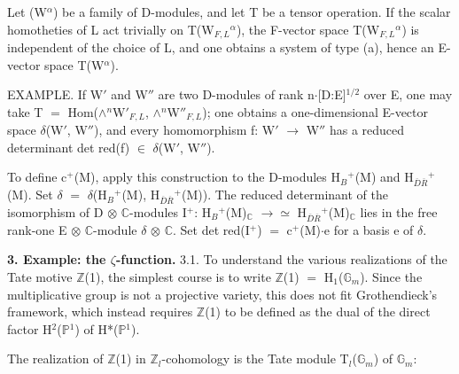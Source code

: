 \documentclass[10pt,twoside]{article}
\newcommand{\SectionLead}[1]{\textbf{\color{D030Accent}#1}}
\begin{document}
Let (W\ensuremath{^{α}}) be a family of D-modules, and let T be a tensor operation. If the scalar homotheties of L act trivially on T(W\ensuremath{_{F,L}}\ensuremath{^{α}}), the F-vector space T(W\ensuremath{_{F,L}}\ensuremath{^{α}}) is independent of the choice of L, and one obtains a system of type (a), hence an E-vector space T(W\ensuremath{^{α}}).\par
EXAMPLE. If W\ensuremath{′} and W\ensuremath{″} are two D-modules of rank n\ensuremath{·}[D:E]\ensuremath{^{1/2}} over E, one may take T \ensuremath{=} Hom(\ensuremath{∧}\ensuremath{^{n}}W\ensuremath{′}\ensuremath{_{F,L}}, \ensuremath{∧}\ensuremath{^{n}}W\ensuremath{″}\ensuremath{_{F,L}}); one obtains a one-dimensional E-vector space \ensuremath{δ}(W\ensuremath{′}, W\ensuremath{″}), and every homomorphism f: W\ensuremath{′} \ensuremath{→} W\ensuremath{″} has a reduced determinant det red(f) \ensuremath{∈} \ensuremath{δ}(W\ensuremath{′}, W\ensuremath{″}).\par
To define c\ensuremath{^{+}}(M), apply this construction to the D-modules H\ensuremath{_{B}}\ensuremath{^{+}}(M) and H\ensuremath{_{\overline{D}\overline{R}}}\ensuremath{^{+}}(M). Set \ensuremath{δ} \ensuremath{=} \ensuremath{δ}(H\ensuremath{_{B}}\ensuremath{^{+}}(M), H\ensuremath{_{\overline{D}\overline{R}}}\ensuremath{^{+}}(M)). The reduced determinant of the isomorphism of D \ensuremath{⊗} \ensuremath{ℂ}-modules I\ensuremath{^{+}}: H\ensuremath{_{B}}\ensuremath{^{+}}(M)\ensuremath{_{ℂ}} \ensuremath{→}\ensuremath{≃} H\ensuremath{_{\overline{D}\overline{R}}}\ensuremath{^{+}}(M)\ensuremath{_{ℂ}} lies in the free rank-one E \ensuremath{⊗} \ensuremath{ℂ}-module \ensuremath{δ} \ensuremath{⊗} \ensuremath{ℂ}. Set det red(I\ensuremath{^{+}}) \ensuremath{=} c\ensuremath{^{+}}(M)\ensuremath{·}e for a basis e of \ensuremath{δ}.\par
\SectionLead{3. Example: the \ensuremath{ζ}-function.} 3.1. To understand the various realizations of the Tate motive \ensuremath{ℤ}(1), the simplest course is to write \ensuremath{ℤ}(1) \ensuremath{=} H\ensuremath{_{1}}(\ensuremath{𝔾}\ensuremath{_{m}}). Since the multiplicative group is not a projective variety, this does not fit Grothendieck’s framework, which instead requires \ensuremath{ℤ}(1) to be defined as the dual of the direct factor H\ensuremath{^{2}}(\ensuremath{ℙ}\ensuremath{^{1}}) of H*(\ensuremath{ℙ}\ensuremath{^{1}}).\par
The realization of \ensuremath{ℤ}(1) in \ensuremath{ℤ}\ensuremath{_{l}}-cohomology is the Tate module T\ensuremath{_{l}}(\ensuremath{𝔾}\ensuremath{_{m}}) of \ensuremath{𝔾}\ensuremath{_{m}}:\par
\end{document}

